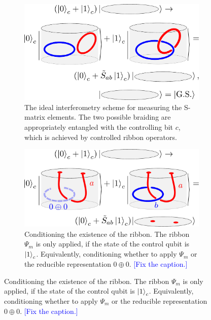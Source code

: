 \documentclass[two column]{article}
\newcommand{\jovan}[1]{\textcolor{blue}{[#1]}}
\begin{document}
\begin{figure}
\centering

\begin{subfigure}{0.47\textwidth}
    \includegraphics[width = \linewidth]{Figures/intef_example.pdf}
    \caption{The ideal interferometry scheme for measuring the S-matrix elements. The two possible braiding are appropriately entangled with the controlling bit $c$, which is achieved by controlled ribbon operators.}
    \label{fig:intef_example}
\end{subfigure}\hfill
\begin{subfigure}{0.47\textwidth}
    \includegraphics[width=\linewidth]{Figures/intefEx.pdf}
    \caption{Conditioning the existence of the ribbon. The ribbon $\Psi_m$ is only applied, if the state of the control qubit is $\ket{1}_c$. Equivalently, conditioning whether to apply $\Psi_m$ or the reducible representation $0\oplus 0$. \jovan{Fix the caption.}}
    \label{fig:cond_ex}
\end{subfigure}


\end{figure}
\end{document}
